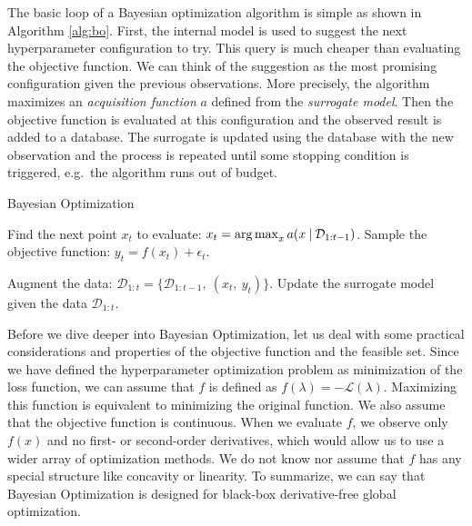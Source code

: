 The basic loop of a Bayesian optimization algorithm is simple as shown in Algorithm \ref{alg:bo}. First, the internal model is used to suggest the next hyperparameter configuration to try. This query is much cheaper than evaluating the objective function. We can think of the suggestion as the most promising configuration given the previous observations. More precisely, the algorithm maximizes an \textit{acquisition function} $a$ defined from the \textit{surrogate model}. Then the objective function is evaluated at this configuration and the observed result is added to a database. The surrogate is updated using the database with the new observation and the process is repeated until some stopping condition is triggered, e.g.\ the algorithm runs out of budget.


\begin{algorithm}
    \caption{Bayesian Optimization}
    \begin{algorithmic}[1]
        \State Find the next point $x_t$ to evaluate: $x_t = \operatorname*{arg\,max}_{x} a(x \:\vert\: \mathcal{D}_{1:t-1})$.
        \State Sample the objective function:  $y_t = f(x_t)+ \epsilon_t$.

        \State Augment the data: $\mathcal{D}_{1:t}= \{\mathcal{D}_{1:t-1}, \: (x_t, \: y_t)\}$.
        \State Update the surrogate model given the data $\mathcal{D}_{1:t}$.
    \EndFor
    \end{algorithmic}
    \label{alg:bo}
\end{algorithm}

Before we dive deeper into Bayesian Optimization, let us deal with some practical considerations and properties of the objective function and the feasible set. Since we have defined the hyperparameter optimization problem as minimization of the loss function, we can assume that $f$ is defined as $f(\lambda)=-\mathcal{L}(\lambda)$. Maximizing this function is equivalent to minimizing the original function. We also assume that the objective function is continuous. When we evaluate $f$, we observe only $f(x)$ and no first- or second-order derivatives, which would allow us to use a wider array of optimization methods. We do not know nor assume that $f$ has any special structure like concavity or linearity. To summarize, we can say that Bayesian Optimization is designed for black-box derivative-free global optimization.


